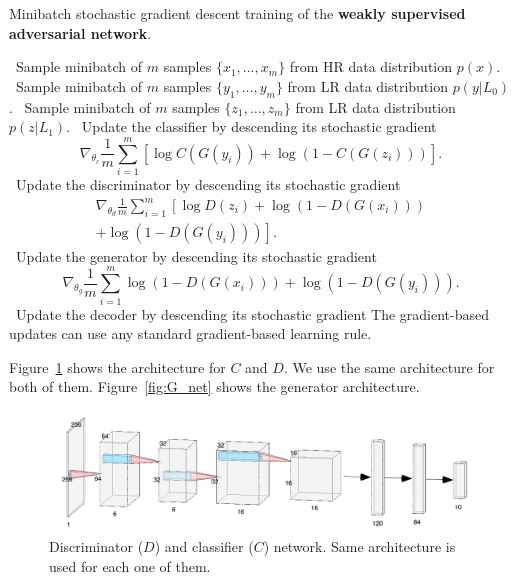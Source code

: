 \documentclass[10pt,twocolumn,letterpaper]{article}
\newcommand{\stateb}{\STATE \textbullet~}
\begin{document}
\begin{algorithm}[h]
    \caption{Minibatch stochastic gradient descent training of the \textbf{weakly supervised adversarial network}.}
    \label{alg:srcgan}
    \begin{algorithmic}
    \stateb Sample minibatch of $m$ samples $\{x_1,\ldots, x_m\}$ from HR data distribution $p(x)$.
    \stateb Sample minibatch of $m$ samples $\{y_1,\ldots, y_m\}$ from LR data distribution $p(y|L_0)$.
    \stateb Sample minibatch of $m$ samples $\{z_1,\ldots, z_m\}$ from LR data distribution $p(z|L_1)$.
    \stateb Update the classifier by descending its stochastic gradient
    \[\nabla_{\theta_c} \frac{1}{m} \sum_{i=1}^m \left[\log C(G(y_i)) + \log(1 - C(G(z_i))) \right]. \]
    \stateb Update the discriminator by descending its stochastic gradient
    \[
    \begin{aligned}
    \nabla_{\theta_d} \frac{1}{m} \sum_{i=1}^m \left[\log D(z_i) + \log(1- D(G(x_i))) \right. \\ \left. + \log(1- D(G(y_i))) \right].
    \end{aligned}
    \]
    \stateb Update the generator by descending its stochastic gradient
    \[
    \nabla_{\theta_{g}} \frac{1}{m} \sum_{i=1}^m \log(1- D(G(x_i)))+\log(1- D(G(y_i))).\]
    \stateb Update the decoder by descending its stochastic gradient
    \ENDFOR
    \STATE The gradient-based updates can use any standard gradient-based learning rule.
    \end{algorithmic}
\end{algorithm}


Figure~\ref{fig:D_net} shows the architecture for $C$ and $D.$ We use the same architecture for both of them. Figure~\ref{fig:G_net} shows the generator architecture.

\begin{figure}[h]
\begin{center}
\includegraphics[scale=0.35]{D_net.png}
\end{center}
   \caption{Discriminator ($D$) and classifier ($C$) network. Same architecture is used for each one of them.}
\label{fig:D_net}
\end{figure}
\end{document}
